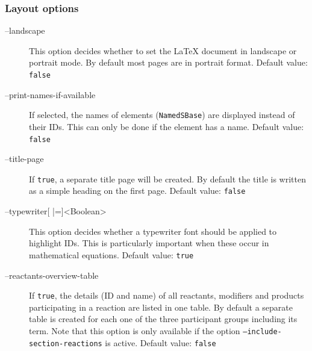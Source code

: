 \subsubsection{Layout options}
\begin{description}
\item[--landscape]
  This option decides whether to set the \LaTeX{} document in landscape
  or portrait mode. By default most pages are in portrait format.
  Default value: \texttt{false}

\item[--print-names-if-available]
  If selected, the names of \SBML elements (\texttt{NamedSBase}) are displayed
  instead of their \acp{ID}. This can only be done if the element
  has a name.
  Default value: \texttt{false}

\item[--title-page]
  If \texttt{true}, a separate title page will be created. By default the
  title is written as a simple heading on the first page.
  Default value: \texttt{false}

\item[--typewriter{[} |={]}<Boolean>]
  This option decides whether a typewriter font should be applied
  to highlight \SBML \acp{ID}. This is particularly important
  when these occur in mathematical equations.
  Default value: \texttt{true}

\item[--reactants-overview-table]
  If \texttt{true}, the details (\ac{ID} and name) of all reactants,
  modifiers and products participating in a reaction are listed
  in one table. By default a separate table is created for each
  one of the three participant groups including its \SBO term.
  Note that this option is only available if the option
  \texttt{--include-section-reactions} is active.
  Default value: \texttt{false}
\end{description}

